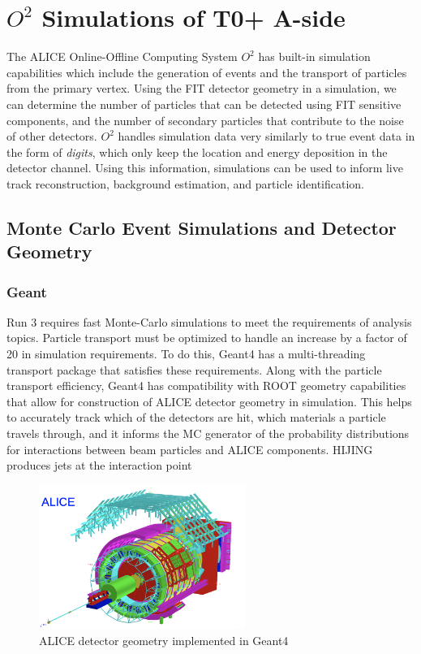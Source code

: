 
\chapter{$O^2$ Simulations of T0+ A-side}
The ALICE Online-Offline Computing System $O^2$ has built-in simulation capabilities which include the generation of events and the transport of particles from the primary vertex. Using the FIT detector geometry in a simulation, we can determine the number of particles that can be detected using FIT sensitive components, and the number of secondary particles that contribute to the noise of other detectors. $O^2$ handles simulation data very similarly to true event data in the form of \textit{digits}, which only keep the location and energy deposition in the detector channel. Using this information, simulations can be used to inform live track reconstruction, background estimation, and particle identification. 


\section{Monte Carlo Event Simulations and Detector Geometry}

\subsection{Geant}
Run 3 requires fast Monte-Carlo simulations to meet the requirements of analysis topics. Particle transport must be optimized to handle an increase by a factor of 20 in simulation requirements. To do this, Geant4 has a multi-threading transport package that satisfies these requirements. Along with the particle transport efficiency, Geant4 has compatibility with ROOT geometry capabilities that allow for construction of ALICE detector geometry in simulation. This helps to accurately track which of the detectors are hit, which materials a particle travels through, and it informs the MC generator of the probability distributions for interactions between beam particles and ALICE components. HIJING produces jets at the interaction point

\begin{figure}[H]
    \centering
    \includegraphics[width=0.6\textwidth]{figures/ALICE/GEANT_Geometry.png}
    \caption{ALICE detector geometry implemented in Geant4}
    \label{fig:GEANT_Geometry}
\end{figure}


